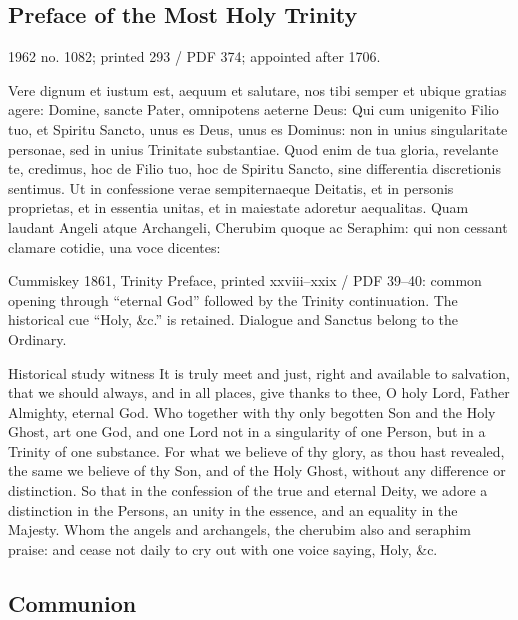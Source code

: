 \subsection{Preface of the Most Holy Trinity}
\label{proper-preface}

1962 no. 1082; printed 293 / PDF 374; appointed after 1706.

\begin{latinproper}
Vere dignum et iustum est, aequum et salutare, nos tibi semper et ubique gratias agere: Domine, sancte Pater, omnipotens aeterne Deus: Qui cum unigenito Filio tuo, et Spiritu Sancto, unus es Deus, unus es Dominus: non in unius singularitate personae, sed in unius Trinitate substantiae. Quod enim de tua gloria, revelante te, credimus, hoc de Filio tuo, hoc de Spiritu Sancto, sine differentia discretionis sentimus. Ut in confessione verae sempiternaeque Deitatis, et in personis proprietas, et in essentia unitas, et in maiestate adoretur aequalitas. Quam laudant Angeli atque Archangeli, Cherubim quoque ac Seraphim: qui non cessant clamare cotidie, una voce dicentes:
\end{latinproper}

Cummiskey 1861, Trinity Preface, printed xxviii–xxix / PDF 39–40: common opening through “eternal God” followed by the Trinity continuation. The historical cue “Holy, \&c.” is retained. Dialogue and Sanctus belong to the Ordinary.

\begin{englishwitness}{Historical study witness}
It is truly meet and just, right and available to salvation, that we should always, and in all places, give thanks to thee, O holy Lord, Father Almighty, eternal God. Who together with thy only begotten Son and the Holy Ghost, art one God, and one Lord not in a singularity of one Person, but in a Trinity of one substance. For what we believe of thy glory, as thou hast revealed, the same we believe of thy Son, and of the Holy Ghost, without any difference or distinction. So that in the confession of the true and eternal Deity, we adore a distinction in the Persons, an unity in the essence, and an equality in the Majesty. Whom the angels and archangels, the cherubim also and seraphim praise: and cease not daily to cry out with one voice saying, Holy, \&c.
\end{englishwitness}

\subsection{Communion}
\label{proper-communion}

